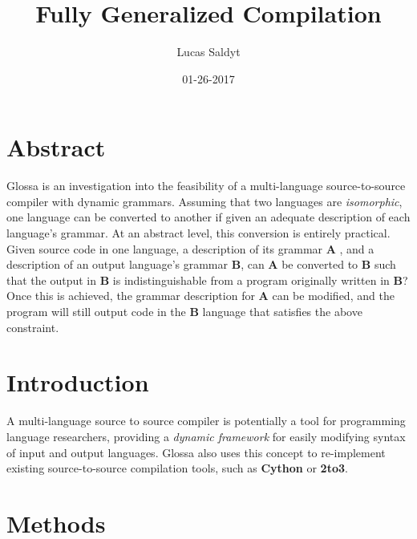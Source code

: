 \documentclass{article}
\title{Fully Generalized Compilation}
\date{01-26-2017}
\author{Lucas Saldyt}
\begin{document}
\maketitle
{}
\newpage
{}

\section{Abstract}
Glossa is an investigation into the feasibility of a multi-language source-to-source compiler with dynamic grammars. 
Assuming that two languages are \textit{isomorphic}, one language can be converted to another if given an adequate description of each language's grammar.
At an abstract level, this conversion is entirely practical. Given source code in one language, a description of its grammar \textbf{A} , and a description of an output language's grammar \textbf{B}, can \textbf{A} be converted to \textbf{B} such that the output in \textbf{B} is indistinguishable from a program originally written in \textbf{B}?
Once this is achieved, the grammar description for \textbf{A} can be modified, and the program will still output code in the \textbf{B} language that satisfies the above constraint.

\section{Introduction}

A multi-language source to source compiler is potentially a tool for programming language researchers, providing a \textit{dynamic framework} for easily modifying syntax of input and output languages. 
Glossa also uses this concept to re-implement existing source-to-source compilation tools, such as \textbf{Cython} or \textbf{2to3}.

\section{Methods}
\end{document}
